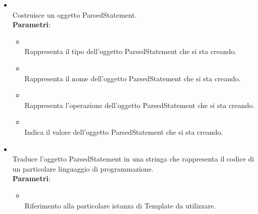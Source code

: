 \begin{itemize}
\begin{itemize}
\item {}
\\ Costruisce un oggetto ParsedStatement.
\\ \textbf{Parametri}:
\begin{itemize}
\item {}
\\ Rappresenta il tipo dell'oggetto ParsedStatement che si sta creando.
\item {}
\\ Rappresenta il nome dell'oggetto ParsedStatement che si sta creando.
\item {}
\\ Rappresenta l'operazione dell'oggetto ParsedStatement che si sta creando.
\item {}
\\ Indica il valore dell'oggetto ParsedStatement che si sta creando.
\end{itemize}
\item {}
\\ Traduce l'oggetto ParsedStatement in una stringa che rappresenta il codice di un particolare linguaggio di programmazione.
\\ \textbf{Parametri}:
\begin{itemize}
\item {}
\\ Riferimento alla particolare istanza di Template da utilizzare.
\end{itemize}
\end{itemize}
\end{itemize}

